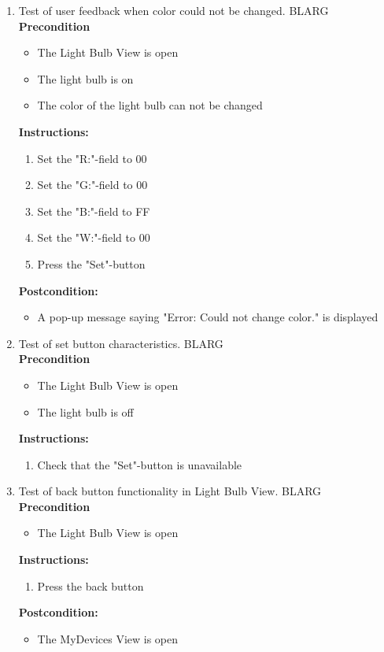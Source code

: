 \documentclass[a4paper]{article}
\newlength{\testlabellength}
\newenvironment{testlist}{\begin{enumerate}[label=\bfseries Instruction \thesubsection.\arabic* , labelindent=0pt, labelwidth=\testlabellength , leftmargin=2cm]}{\end{enumerate}}
\newenvironment{precondition}{
{\color{white}BLARG}\\ 
\textbf{Precondition}
\begin{itemize}[labelindent=0cm, labelwidth=2cm , leftmargin=1cm]
}
{\end{itemize}}
\newenvironment{instruction}{
\textbf{Instructions:}
\begin{enumerate}[label=\bfseries  \arabic*., labelindent=0cm, labelwidth=2cm , leftmargin=1cm]
}
{\end{enumerate}}
\newenvironment{postcondition}{
\textbf{Postcondition:}
\begin{itemize}[labelindent=0cm, labelwidth=2cm , leftmargin=1cm]
}
{\end{itemize}}
\begin{document}
\begin{appendices}
\begin{testlist}
	\item Test of user feedback when color could not be changed.
		\begin{precondition}
			\item The Light Bulb View is open
			\item The light bulb is on
			\item The color of the light bulb can not be changed
		\end{precondition}
		\begin{instruction}
			\item Set the "R:"-field to 00
			\item Set the "G:"-field to 00
			\item Set the "B:"-field to FF
			\item Set the "W:"-field to 00
			\item Press the "Set"-button
		\end{instruction}
		\begin{postcondition}
			\item A pop-up message saying "Error: Could not change color." is displayed
		\end{postcondition}

	\item Test of set button characteristics.
		\begin{precondition}
			\item The Light Bulb View is open
			\item The light bulb is off
		\end{precondition}
		\begin{instruction}
			\item Check that the "Set"-button is unavailable
		\end{instruction}
		
	\item Test of back button functionality in Light Bulb View.
		\begin{precondition}
			\item The Light Bulb View is open
		\end{precondition}
		\begin{instruction}
			\item Press the back button
		\end{instruction}
		\begin{postcondition}
			\item The MyDevices View is open
		\end{postcondition}
    

\end{testlist}
\end{appendices}
\end{document}
